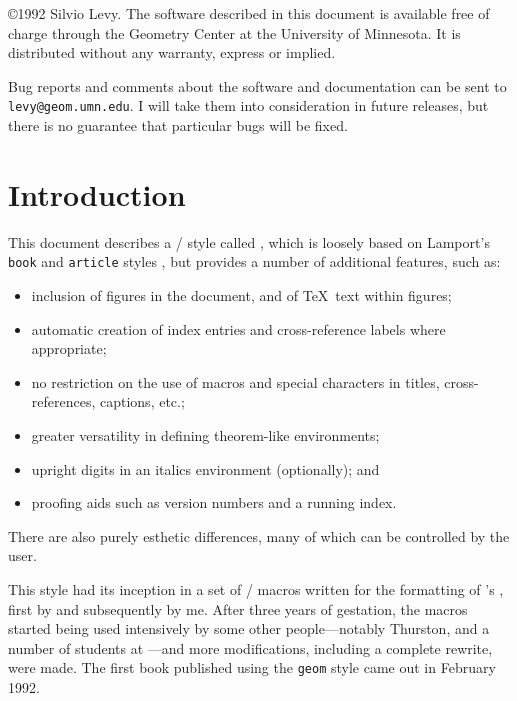 \vfil

\copyright 1992 Silvio Levy. The software described in this document
is available free of charge through the Geometry Center at the
University of Minnesota.  It is distributed without any warranty,
express or implied.

Bug reports and comments about the software and documentation
can be sent to {\tt levy@geom.umn.edu}.  I will take them into
consideration in future releases, but there is no
guarantee that particular bugs will be fixed.

\vfil\eject

\section{Introduction} 

This document describes a \latex/ style called ,
which is loosely based on Lamport's \verb+book+ 
and \verb+article+ styles \cite{Lamport},
but provides a number of additional features, such as:
\begin{itemize}
\item 
inclusion of  figures in the document,
and of \TeX\ text within figures;
\item
automatic creation of index entries and cross-reference
labels where appropriate;
\item
no restriction on the use of macros and special characters in
titles, cross-references, captions, etc.;
\item
greater versatility in defining theorem-like environments;
\item
upright digits in an italics environment (optionally); and
\item
proofing aids such as version numbers and a running index.
\end{itemize}
There are also purely esthetic differences,
many of which can be controlled by the user.

This style had its inception in a set of \latex/ macros
%
%
written for the formatting of 's , first by 
and subsequently by me.  After three years of gestation, the macros
started being used intensively by some other people---notably Thurston,
 and a number of students at ---and more modifications, including a complete rewrite,
were made.  The first book published using the \verb+geom+ style
\cite{Epstein:WordProcessing} came out in February 1992.

